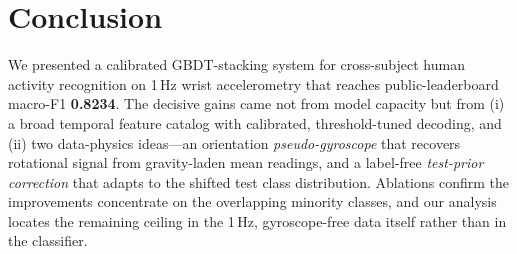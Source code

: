 \documentclass[conference]{IEEEtran}
\begin{document}
\section{Conclusion}
We presented a calibrated GBDT-stacking system for cross-subject human activity recognition on 1\,Hz wrist
accelerometry that reaches public-leaderboard macro-F1 \textbf{0.8234}. The decisive gains came not
from model capacity but from (i) a broad temporal feature catalog with calibrated, threshold-tuned decoding,
and (ii) two data-physics ideas---an orientation \emph{pseudo-gyroscope} that recovers rotational signal from
gravity-laden mean readings, and a label-free \emph{test-prior correction} that adapts to the shifted test
class distribution. Ablations confirm the improvements concentrate on the overlapping minority classes, and
our analysis locates the remaining ceiling in the 1\,Hz, gyroscope-free data itself rather than in the
classifier.





\end{document}
